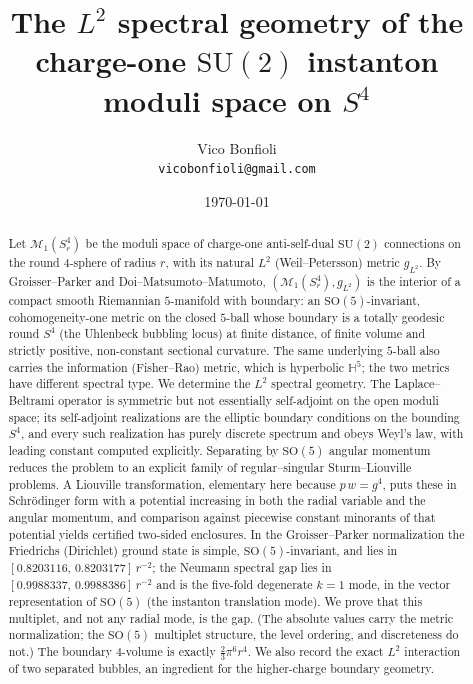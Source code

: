 \documentclass[11pt,letterpaper]{article}
\title{The $L^2$ spectral geometry of the charge-one $\mathrm{SU}(2)$ instanton moduli space on $S^4$}
\author{Vico Bonfioli\\\small\texttt{vicobonfioli@gmail.com}}
\date{\today}
\newcommand{\bbH}{\mathbb{H}}
\newcommand{\cM}{\mathcal{M}}
\newcommand{\SO}{\mathrm{SO}}
\theoremstyle{plain}
\theoremstyle{remark}
\begin{document}
\maketitle

\begin{abstract}
Let $\cM_1(S^4_r)$ be the moduli space of charge-one anti-self-dual $\mathrm{SU}(2)$ connections on the round $4$-sphere of radius $r$, with its natural $L^2$ (Weil--Petersson) metric $g_{L^2}$. By Groisser--Parker and Doi--Matsumoto--Matumoto, $(\cM_1(S^4_r),g_{L^2})$ is the interior of a compact smooth Riemannian $5$-manifold with boundary: an $\SO(5)$-invariant, cohomogeneity-one metric on the closed $5$-ball whose boundary is a totally geodesic round $S^4$ (the Uhlenbeck bubbling locus) at finite distance, of finite volume and strictly positive, non-constant sectional curvature. The same underlying $5$-ball also carries the information (Fisher--Rao) metric, which is hyperbolic $\bbH^5$; the two metrics have different spectral type. We determine the $L^2$ spectral geometry. The Laplace--Beltrami operator is symmetric but not essentially self-adjoint on the open moduli space; its self-adjoint realizations are the elliptic boundary conditions on the bounding $S^4$, and every such realization has purely discrete spectrum and obeys Weyl's law, with leading constant computed explicitly. Separating by $\SO(5)$ angular momentum reduces the problem to an explicit family of regular--singular Sturm--Liouville problems. A Liouville transformation, elementary here because $p\,w=g^4$, puts these in Schr\"odinger form with a potential increasing in both the radial variable and the angular momentum, and comparison against piecewise constant minorants of that potential yields certified two-sided enclosures. In the Groisser--Parker normalization the Friedrichs (Dirichlet) ground state is simple, $\SO(5)$-invariant, and lies in $[0.8203116,\,0.8203177]\,r^{-2}$; the Neumann spectral gap lies in $[0.9988337,\,0.9988386]\,r^{-2}$ and is the five-fold degenerate $k=1$ mode, in the vector representation of $\SO(5)$ (the instanton translation mode). We prove that this multiplet, and not any radial mode, is the gap. (The absolute values carry the metric normalization; the $\SO(5)$ multiplet structure, the level ordering, and discreteness do not.) The boundary $4$-volume is exactly $\tfrac23\pi^6 r^4$. We also record the exact $L^2$ interaction of two separated bubbles, an ingredient for the higher-charge boundary geometry.
\end{abstract}
\end{document}
